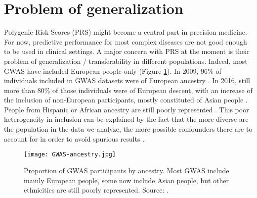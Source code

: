 \section{Problem of generalization}

Polygenic Risk Scores (PRS) might become a central part in precision medicine. For now, predictive performance for most complex diseases are not good enough to be used in clinical settings. 
A major concern with PRS at the moment is their problem of generalization / transferability in different populations. 
Indeed, most GWAS have included European people only (Figure \ref{fig:GWAS-ancestry}). In 2009, 96\% of individuals included in GWAS datasets were of European ancestry \cite[]{need2009next}. In 2016, still more than 80\% of those individuals were of European descent, with an increase of the inclusion of non-European participants, mostly constituted of Asian people \cite[]{popejoy2016genomics}. People from Hispanic or African ancestry are still poorly represented \cite[]{martin2019clinical}.
This poor heterogeneity in inclusion can be explained by the fact that the more diverse are the population in the data we analyze, the more possible confounders there are to account for in order to avoid spurious results \cite[]{popejoy2016genomics}. 

\begin{figure}[htpb]
\centerline{\texttt{[image: GWAS-ancestry.jpg]}}
\caption{Proportion of GWAS participants by ancestry. Most GWAS include mainly European people, some now include Asian people, but other ethnicities are still poorly represented. Source: \cite{popejoy2016genomics}.}
\label{fig:GWAS-ancestry}
\end{figure}

